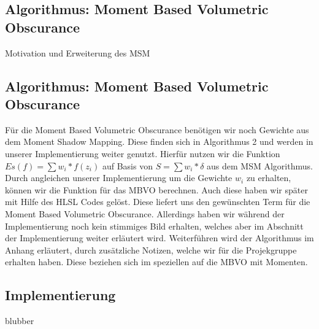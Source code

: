 \documentclass[runningheaders,a4paper]{llncs}
\begin{document}
\subsection{Algorithmus: Moment Based Volumetric Obscurance}
Motivation und Erweiterung des MSM\\


\subsection{Algorithmus: Moment Based Volumetric Obscurance}
Für die Moment Based Volumetric Obscurance benötigen wir noch Gewichte aus dem Moment Shadow Mapping. Diese finden sich in Algorithmus 2 und werden in unserer Implementierung weiter genutzt.
Hierfür nutzen wir die Funktion $Es(f) = \sum w_i*f(z_i)$ \cite{mbvo} auf Basis von $S = \sum w_i*\delta$ aus dem MSM Algorithmus. Durch angleichen unserer Implementierung um die Gewichte $w_i$ zu erhalten, können wir die Funktion für das MBVO berechnen. Auch diese haben wir später mit Hilfe des HLSL Codes gelöst. Diese liefert uns den gewünschten Term für die Moment Based Volumetric Obscurance. Allerdings haben wir während der Implementierung noch kein stimmiges Bild erhalten, welches aber im Abschnitt der Implementierung weiter erläutert wird. Weiterführen wird der Algorithmus im Anhang erläutert, durch zusätzliche Notizen, welche wir für die Projekgruppe erhalten haben. Diese beziehen sich im speziellen auf die MBVO mit Momenten.\cite{mbvo}

\subsection{Implementierung}
blubber
\end{document}
